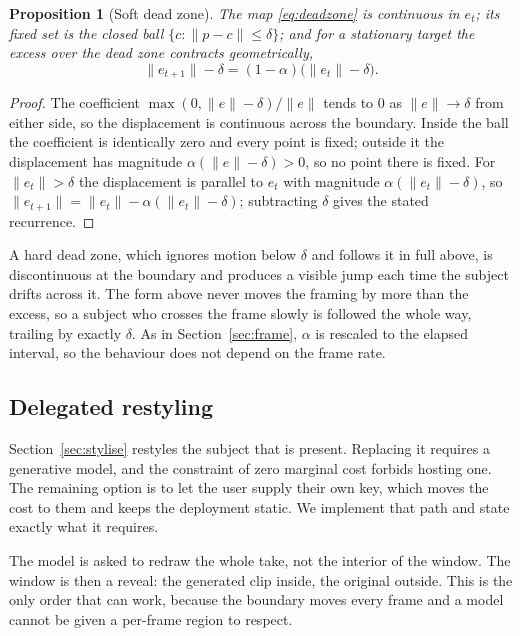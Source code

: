 \documentclass{article}
\newtheorem{proposition}{Proposition}
\theoremstyle{definition}
\begin{document}
\begin{proposition}[Soft dead zone]
\label{prop:deadzone}
The map \eqref{eq:deadzone} is continuous in $e_t$; its fixed set is the closed
ball $\{c : \|p-c\| \le \delta\}$; and for a stationary target the excess over
the dead zone contracts geometrically,
\[
  \|e_{t+1}\| - \delta = (1-\alpha)\big(\|e_t\| - \delta\big).
\]
\end{proposition}

\begin{proof}
The coefficient $\max(0,\|e\|-\delta)/\|e\|$ tends to $0$ as $\|e\|\to\delta$
from either side, so the displacement is continuous across the boundary. Inside
the ball the coefficient is identically zero and every point is fixed; outside it
the displacement has magnitude $\alpha(\|e\|-\delta) > 0$, so no point there is
fixed. For $\|e_t\| > \delta$ the displacement
is parallel to $e_t$ with magnitude $\alpha(\|e_t\|-\delta)$, so
$\|e_{t+1}\| = \|e_t\| - \alpha(\|e_t\|-\delta)$; subtracting $\delta$ gives the
stated recurrence.
\end{proof}

A hard dead zone, which ignores motion below $\delta$ and follows it in full
above, is discontinuous at the boundary and produces a visible jump each time the
subject drifts across it. The form above never moves the framing by more than the
excess, so a subject who crosses the frame slowly is followed the whole way,
trailing by exactly $\delta$. As in Section~\ref{sec:frame}, $\alpha$ is rescaled
to the elapsed interval, so the behaviour does not depend on the frame rate.

\subsection{Delegated restyling}
\label{sec:delegated}

Section~\ref{sec:stylise} restyles the subject that is present. Replacing it
requires a generative model, and the constraint of zero marginal cost forbids
hosting one. The remaining option is to let the user supply their own key, which
moves the cost to them and keeps the deployment static. We implement that path
and state exactly what it requires.

The model is asked to redraw the whole take, not the interior of the window. The
window is then a reveal: the generated clip inside, the original outside. This is
the only order that can work, because the boundary moves every frame and a model
cannot be given a per-frame region to respect.
\end{document}
